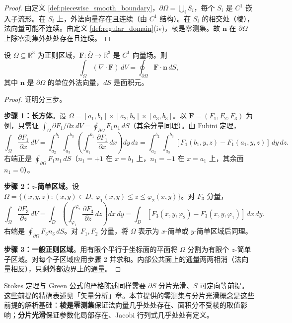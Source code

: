 \begin{proof}
由定义 \ref{def:piecewise_smooth_boundary}，$\partial \Omega = \bigcup_i S_i$，每个 $S_i$ 是 $C^1$ 嵌入子流形。在 $S_i$ 上，外法向量存在且连续（由 $C^1$ 结构）。在 $S_i$ 的相交处（棱），法向量可能不连续。由定义 \ref{def:regular_domain}(iv)，棱是零测集。故 $\mathbf{n}$ 在 $\partial \Omega$ 上除零测集外处处存在且连续。
\end{proof}

\begin{theorem}\label{thm:gauss_regularity}
设 $\Omega \subseteq \mathbb{R}^3$ 为正则区域，$\mathbf{F}: \overline{\Omega} \to \mathbb{R}^3$ 是 $C^1$ 向量场。则
\[
\int_\Omega (\nabla \cdot \mathbf{F}) \, dV = \oint_{\partial \Omega} \mathbf{F} \cdot \mathbf{n} \, dS,
\]
其中 $\mathbf{n}$ 是 $\partial \Omega$ 的单位外法向量，$dS$ 是面积元。
\end{theorem}

\begin{proof}
证明分三步。

\textbf{步骤 1：长方体}。设 $\Omega = [a_1, b_1] \times [a_2, b_2] \times [a_3, b_3]$。以 $\mathbf{F} = (F_1, F_2, F_3)$ 为例，只需证 $\int_\Omega \partial F_1/\partial x \, dV = \oint_{\partial \Omega} F_1 n_1 \, dS$（其余分量同理）。由 Fubini 定理，
\[
\int_\Omega \frac{\partial F_1}{\partial x} \, dV = \int_{a_2}^{b_2} \int_{a_3}^{b_3} \left( \int_{a_1}^{b_1} \frac{\partial F_1}{\partial x} \, dx \right) dy \, dz = \int_{a_2}^{b_2} \int_{a_3}^{b_3} [F_1(b_1, y, z) - F_1(a_1, y, z)] \, dy \, dz.
\]
右端正是 $\oint_{\partial \Omega} F_1 n_1 \, dS$（$n_1 = +1$ 在 $x = b_1$ 上，$n_1 = -1$ 在 $x = a_1$ 上，其余面 $n_1 = 0$）。

\textbf{步骤 2：$z$-简单区域}。设 $\Omega = \{(x, y, z) : (x, y) \in D,\ \varphi_1(x, y) \le z \le \varphi_2(x, y)\}$。对 $F_3$ 分量，
\[
\int_\Omega \frac{\partial F_3}{\partial z} \, dV = \int_D \left( \int_{\varphi_1}^{\varphi_2} \frac{\partial F_3}{\partial z} \, dz \right) dx \, dy = \int_D [F_3(x, y, \varphi_2) - F_3(x, y, \varphi_1)] \, dx \, dy.
\]
右端是 $\oint_{\partial \Omega} F_3 n_3 \, dS$。对 $F_1, F_2$ 分量，将 $\Omega$ 表示为 $x$-简单或 $y$-简单区域后同理。

\textbf{步骤 3：一般正则区域}。用有限个平行于坐标面的平面将 $\Omega$ 分割为有限个 $z$-简单子区域。对每个子区域应用步骤 2 并求和。内部公共面上的通量两两相消（法向量相反），只剩外部边界上的通量。
\end{proof}

\begin{remark}\label{rem:stokes_green_regularity}
Stokes 定理与 Green 公式的严格陈述同样需要 $\partial S$ 分片光滑、$S$ 可定向等前提。这些前提的精确表述见「矢量分析」章。本节提供的零测集与分片光滑概念是这些前提的解析基础：\textbf{棱是零测集}保证法向量几乎处处存在、面积分不受棱的取值影响；\textbf{分片光滑}保证参数化局部存在、Jacobi 行列式几乎处处有定义。
\end{remark}

